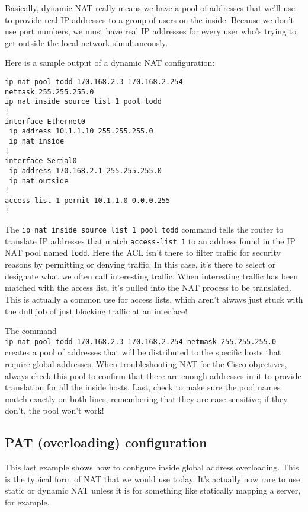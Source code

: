 Basically, dynamic NAT really means we have a pool of addresses that
we'll use to provide real IP addresses to a group of users on the
inside. Because we don't use port numbers, we must have real IP
addresses for every user who's trying to get outside the local network
simultaneously.

Here is a sample output of a dynamic NAT configuration:

\begin{verbatim}
ip nat pool todd 170.168.2.3 170.168.2.254
netmask 255.255.255.0
ip nat inside source list 1 pool todd
!
interface Ethernet0
 ip address 10.1.1.10 255.255.255.0
 ip nat inside
!
interface Serial0
 ip address 170.168.2.1 255.255.255.0
 ip nat outside
!
access-list 1 permit 10.1.1.0 0.0.0.255
!
\end{verbatim}

The \texttt{ip\ nat\ inside\ source\ list\ 1\ pool\ todd} command tells
the router to translate IP addresses that match \texttt{access-list\ 1}
to an address found in the IP NAT pool named \texttt{todd}. Here the ACL
isn't there to filter traffic for security reasons by permitting or
denying traffic. In this case, it's there to select or designate what we
often call interesting traffic. When interesting traffic has been
matched with the access list, it's pulled into the NAT process to be
translated. This is actually a common use for access lists, which aren't
always just stuck with the dull job of just blocking traffic at an
interface!

The command
\texttt{ip\ nat\ pool\ todd\ 170.168.2.3\ 170.168.2.254\ netmask\ 255.255.255.0}
creates a pool of addresses that will be distributed to the specific
hosts that require global addresses. When troubleshooting NAT for the
Cisco objectives, always check this pool to confirm that there are
enough addresses in it to provide translation for all the inside hosts.
Last, check to make sure the pool names match exactly on both lines,
remembering that they are case sensitive; if they don't, the pool won't
work!



\subsection{PAT (overloading) configuration}

This last example shows how to configure inside global address
overloading. This is the typical form of NAT that we would use today.
It's actually now rare to use static or dynamic NAT unless it is for
something like statically mapping a server, for example.


